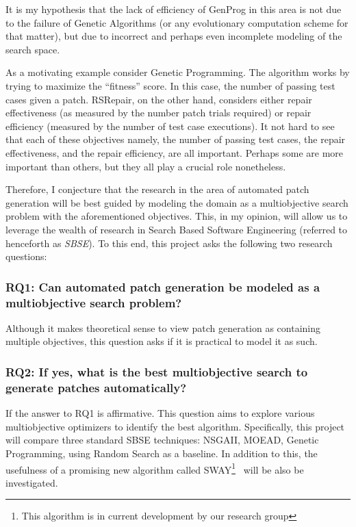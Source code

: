 \documentclass[]{sig-alternate}
\theoremstyle{break}
\begin{document}
It is my hypothesis that the lack of efficiency of GenProg in this area is not due to the failure of Genetic Algorithms (or any evolutionary computation scheme for that matter), but due to incorrect and perhaps even incomplete modeling of the search space.

As a motivating example consider Genetic Programming. The algorithm works by trying to maximize the ``fitness'' score. In this case, the number of passing test cases given a patch. RSRepair, on the other hand, considers either repair effectiveness (as measured by the number patch trials required) or repair efficiency (measured by the number of test case executions). It not hard to see that each of these objectives namely, the number of passing test cases, the repair effectiveness, and the repair efficiency, are all important. Perhaps some are more important than others, but they all play a crucial role nonetheless.

Therefore, I conjecture that the research in the area of automated patch generation will be best guided by modeling the domain as a multiobjective search problem with the aforementioned objectives. This, in my opinion, will allow us to leverage the wealth of research in Search Based Software Engineering (referred to henceforth as \textit{SBSE}). To this end, this project asks the following two research questions:

\subsubsection*{RQ1: Can automated patch generation be modeled as a multiobjective search problem?}
Although it makes theoretical sense to view patch generation as containing multiple objectives, this question asks if it is practical to model it as such.

\subsubsection*{RQ2: If yes, what is the best multiobjective search to generate patches automatically?}
\label{rq2}
If the answer to RQ1 is affirmative. This question aims to explore various multiobjective optimizers to identify the best algorithm. Specifically, this project will compare three standard SBSE techniques: NSGAII, MOEAD, Genetic Programming, using Random Search as a baseline. In addition to this, the usefulness of a promising new algorithm called SWAY\footnote{This algorithm is in current development by our research group}~\cite{chen2016sampling, nair2016accidental} will be also be investigated.
\end{document}
